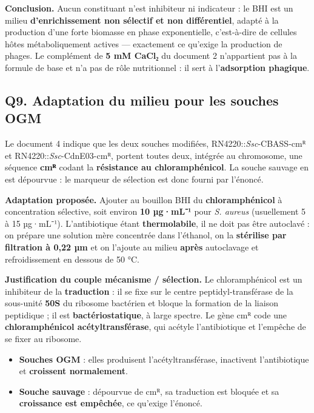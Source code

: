\documentclass[11pt,a4paper]{article}
\providecommand{\tightlist}{\setlength{\itemsep}{0pt}\setlength{\parskip}{0pt}}
\begin{document}
\textbf{Conclusion.} Aucun constituant n'est inhibiteur ni indicateur : le BHI est un milieu \textbf{d'enrichissement non sélectif et non différentiel}, adapté à la production d'une forte biomasse en phase exponentielle, c'est-à-dire de cellules hôtes métaboliquement actives --- exactement ce qu'exige la production de phages. Le complément de \textbf{5 mM CaCl₂} du document 2 n'appartient pas à la formule de base et n'a pas de rôle nutritionnel : il sert à l'\textbf{adsorption phagique}.

\hypertarget{q9.-adaptation-du-milieu-pour-les-souches-ogm}{%
\subsection{Q9. Adaptation du milieu pour les souches OGM}\label{q9.-adaptation-du-milieu-pour-les-souches-ogm}}

Le document 4 indique que les deux souches modifiées, RN4220::\emph{Ssc}-CBASS-cmᴿ et RN4220::\emph{Ssc}-CdnE03-cmᴿ, portent toutes deux, intégrée au chromosome, une séquence \textbf{cmᴿ} codant la \textbf{résistance au chloramphénicol}. La souche sauvage en est dépourvue : le marqueur de sélection est donc fourni par l'énoncé.

\textbf{Adaptation proposée.} Ajouter au bouillon BHI du \textbf{chloramphénicol} à concentration sélective, soit environ \textbf{10 µg·mL⁻¹} pour \emph{S. aureus} (usuellement 5 à 15 µg·mL⁻¹). L'antibiotique étant \textbf{thermolabile}, il ne doit pas être autoclavé : on prépare une solution mère concentrée dans l'éthanol, on la \textbf{stérilise par filtration à 0,22 µm} et on l'ajoute au milieu \textbf{après} autoclavage et refroidissement en dessous de 50 °C.

\textbf{Justification du couple mécanisme / sélection.} Le chloramphénicol est un inhibiteur de la \textbf{traduction} : il se fixe sur le centre peptidyl-transférase de la sous-unité \textbf{50S} du ribosome bactérien et bloque la formation de la liaison peptidique ; il est \textbf{bactériostatique}, à large spectre. Le gène cmᴿ code une \textbf{chloramphénicol acétyltransférase}, qui acétyle l'antibiotique et l'empêche de se fixer au ribosome.

\begin{itemize}
\tightlist
\item
  \textbf{Souches OGM} : elles produisent l'acétyltransférase, inactivent l'antibiotique et \textbf{croissent normalement}.
\item
  \textbf{Souche sauvage} : dépourvue de cmᴿ, sa traduction est bloquée et sa \textbf{croissance est empêchée}, ce qu'exige l'énoncé.
\end{itemize}
\end{document}
